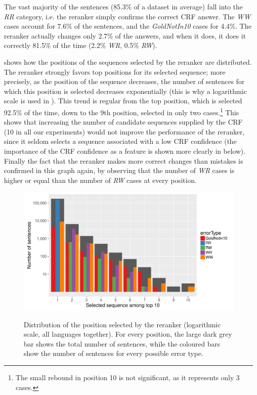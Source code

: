 \documentclass[output=paper,modfonts,nonflat]{langsci/langscibook}
\begin{document}
The vast majority of the sentences (85.3\% of a dataset in average)
fall into the {\em RR} category, i.e. the reranker simply confirms the
correct CRF answer. The {\em WW} cases account for 7.6\% of the sentences, and
the {\em GoldNotIn10} cases for 4.4\%. The reranker actually changes
only 2.7\% of the answers, and when it does, it does it correctly
81.5\% of the time (2.2\% {\em WR}, 0.5\% {\em RW}).




 shows how the positions of the
sequences selected by the reranker are distributed. The reranker
strongly favors top positions for its selected sequence; more
precisely, as the position of the sequence decreases, the number of
sentences for which this position is selected decreases exponentially
(this is why a logarithmic scale is used in
). This trend is regular from the top position,
which is selected 92.5\% of the time, down to the 9th position,
selected in only two cases.\footnote{The small rebound in position 10
  is not significant, as it represents only 3 cases.} This shows that
increasing the number of candidate sequences supplied by the CRF (10
in all our experiments) would not improve the performance of the
reranker, since it seldom selects a sequence associated with a low CRF
confidence (the importance of the CRF confidence as a feature is shown
more clearly in  below). Finally the fact
that the reranker makes more correct changes than mistakes is
confirmed in this graph again, by observing that the number of {\em
  WR} cases is higher or equal than the number of {\em RW} cases at
every position.


\begin{figure}
  \centering
      {\includegraphics[scale=0.4]{figures/graph-selected-seq-log-by-error-type.pdf}}
      {\caption{{Distribution of the position selected by the reranker
            (logarithmic scale, all languages together).} For every position, the large dark
          grey bar shows the total number of sentences, while the
          coloured bars show the number of sentences for every possible
          error type.\protect\footnotemark
        }\label{fig:selectedSeqNo}}
\end{figure}
\end{document}
